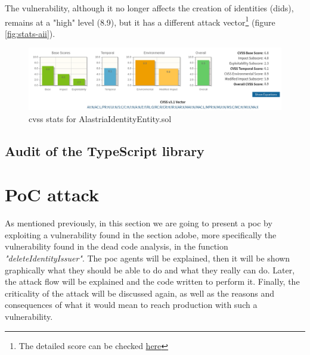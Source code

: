 \documentclass[a4paper, 12pt]{article} %
\begin{document}
            The vulnerability, although it no longer affects the creation of identities (\acrshort{did}s), remains at a "high" level (8.9), but it has a different attack vector\footnote{The detailed score can be checked \href{https://nvd.nist.gov/vuln-metrics/cvss/v3-calculator?vector=AV:N/AC:L/PR:H/UI:N/S:C/C:H/I:N/A:N/E:F/RL:O/RC:R/CR:H/IR:X/AR:X/MAV:N/MAC:L/MPR:N/MUI:N/MS:C/MC:H/MI:X/MA:X&version=3.1}{here}} (figure \ref{fig:stats-aii}).\\
            \begin{figure}[h]
                \centering
                \includegraphics[width=1.1\textwidth]{stats-aie.png}
                \caption{\acrshort{cvss} stats for AlastriaIdentityEntity.sol}
                \label{fig:stats-aie}
            \end{figure}
        \subsection{Audit of the TypeScript library}

\newpage
\section{PoC attack}
    As mentioned previously, in this section we are going to present a \acrfull{poc} by exploiting a vulnerability found in the section adobe, more specifically the vulnerability found in the dead code analysis, in the function \textit{"deleteIdentityIssuer"}. The \acrshort{poc} agents will be explained, then it will be shown graphically what they should be able to do and what they really can do. Later, the attack flow will be explained and the code written to perform it. Finally, the criticality of the attack will be discussed again, as well as the reasons and consequences of what it would mean to reach production with such a vulnerability.
\end{document}
